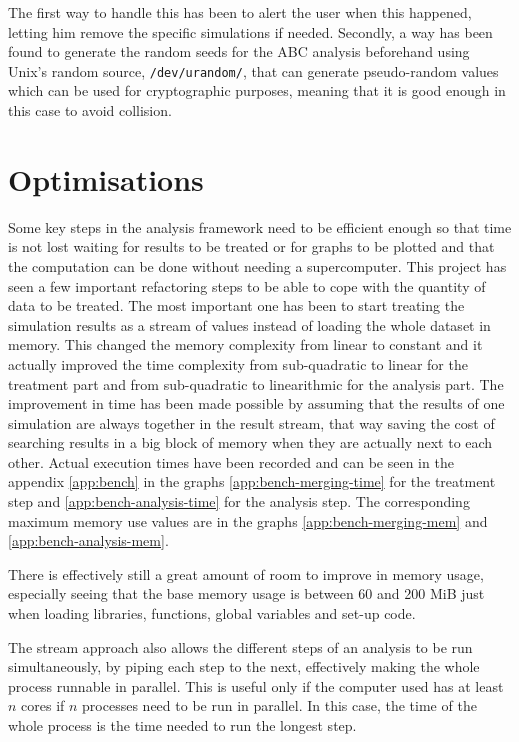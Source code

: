 \documentclass[a4paper,12pt]{report}
\begin{document}
The first way to handle this has been to alert the user when this happened, letting him remove the specific simulations if needed. Secondly, a way has been found to generate the random seeds for the ABC analysis beforehand using Unix’s random source, \texttt{/dev/urandom/}, that can generate pseudo-random values which can be used for cryptographic purposes, meaning that it is good enough in this case to avoid collision.

\section{Optimisations}
Some key steps in the analysis framework need to be efficient enough so that time is not lost waiting for results to be treated or for graphs to be plotted and that the computation can be done without needing a supercomputer.
This project has seen a few important refactoring steps to be able to cope with the quantity of data to be treated. The most important one has been to start treating the simulation results as a stream of values instead of loading the whole dataset in memory. This changed the memory complexity from linear to constant and it actually improved the time complexity from sub-quadratic to linear for the treatment part and from sub-quadratic to linearithmic for the analysis part. The improvement in time has been made possible by assuming that the results of one simulation are always together in the result stream, that way saving the cost of searching results in a big block of memory when they are actually next to each other.
Actual execution times have been recorded and can be seen in the appendix \ref{app:bench} in the graphs \ref{app:bench-merging-time} for the treatment step and \ref{app:bench-analysis-time} for the analysis step. The corresponding maximum memory use values are in the graphs \ref{app:bench-merging-mem} and \ref{app:bench-analysis-mem}.

There is effectively still a great amount of room to improve in memory usage, especially seeing that the base memory usage is between 60 and 200 MiB just when loading libraries, functions, global variables and set-up code.

The stream approach also allows the different steps of an analysis to be run simultaneously, by piping each step to the next, effectively making the whole process runnable in parallel. This is useful only if the computer used has at least $n$ cores if $n$ processes need to be run in parallel. In this case, the time of the whole process is the time needed to run the longest step.
\end{document}
